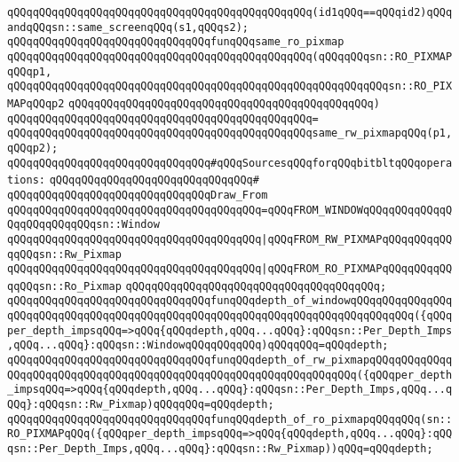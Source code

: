 \verb|qQQqqQQqqQQqqQQqqQQqqQQqqQQqqQQqqQQqqQQqqQQqqQQq(id1qQQq==qQQqid2)qQQqandqQQqsn::same_screenqQQq(s1,qQQqs2);|\newline
\newline
\verb|qQQqqQQqqQQqqQQqqQQqqQQqqQQqqQQqfunqQQqsame_ro_pixmap|\newline
\verb|qQQqqQQqqQQqqQQqqQQqqQQqqQQqqQQqqQQqqQQqqQQqqQQq(qQQqqQQqsn::RO_PIXMAPqQQqp1,|\newline
\verb|qQQqqQQqqQQqqQQqqQQqqQQqqQQqqQQqqQQqqQQqqQQqqQQqqQQqqQQqqQQqsn::RO_PIXMAPqQQqp2|\newline
\verb|qQQqqQQqqQQqqQQqqQQqqQQqqQQqqQQqqQQqqQQqqQQqqQQq)|\newline
\verb|qQQqqQQqqQQqqQQqqQQqqQQqqQQqqQQqqQQqqQQqqQQqqQQq=|\newline
\verb|qQQqqQQqqQQqqQQqqQQqqQQqqQQqqQQqqQQqqQQqqQQqqQQqsame_rw_pixmapqQQq(p1,qQQqp2);|\newline
\newline
\verb|qQQqqQQqqQQqqQQqqQQqqQQqqQQqqQQq#qQQqSourcesqQQqforqQQqbitbltqQQqoperations:|\newline
\verb|qQQqqQQqqQQqqQQqqQQqqQQqqQQqqQQq#|\newline
\verb|qQQqqQQqqQQqqQQqqQQqqQQqqQQqqQQqDraw_From|\newline
\verb|qQQqqQQqqQQqqQQqqQQqqQQqqQQqqQQqqQQqqQQq=qQQqFROM_WINDOWqQQqqQQqqQQqqQQqqQQqqQQqqQQqsn::Window|\newline
\verb|qQQqqQQqqQQqqQQqqQQqqQQqqQQqqQQqqQQqqQQq|\verb#|qQQqFROM_RW_PIXMAPqQQqqQQqqQQqqQQqsn::Rw_Pixmap#\newline
\verb|qQQqqQQqqQQqqQQqqQQqqQQqqQQqqQQqqQQqqQQq|\verb#|qQQqFROM_RO_PIXMAPqQQqqQQqqQQqqQQqsn::Ro_Pixmap#\newline
\verb|qQQqqQQqqQQqqQQqqQQqqQQqqQQqqQQqqQQqqQQq;|\newline
\newline
\verb|qQQqqQQqqQQqqQQqqQQqqQQqqQQqqQQqfunqQQqdepth_of_windowqQQqqQQqqQQqqQQqqQQqqQQqqQQqqQQqqQQqqQQqqQQqqQQqqQQqqQQqqQQqqQQqqQQqqQQqqQQqqQQq({qQQqper_depth_impsqQQq=>qQQq{qQQqdepth,qQQq...qQQq}:qQQqsn::Per_Depth_Imps,qQQq...qQQq}:qQQqsn::WindowqQQqqQQqqQQq)qQQqqQQq=qQQqdepth;|\newline
\verb|qQQqqQQqqQQqqQQqqQQqqQQqqQQqqQQqfunqQQqdepth_of_rw_pixmapqQQqqQQqqQQqqQQqqQQqqQQqqQQqqQQqqQQqqQQqqQQqqQQqqQQqqQQqqQQqqQQqqQQq({qQQqper_depth_impsqQQq=>qQQq{qQQqdepth,qQQq...qQQq}:qQQqsn::Per_Depth_Imps,qQQq...qQQq}:qQQqsn::Rw_Pixmap)qQQqqQQq=qQQqdepth;|\newline
\verb|qQQqqQQqqQQqqQQqqQQqqQQqqQQqqQQqfunqQQqdepth_of_ro_pixmapqQQqqQQq(sn::RO_PIXMAPqQQq({qQQqper_depth_impsqQQq=>qQQq{qQQqdepth,qQQq...qQQq}:qQQqsn::Per_Depth_Imps,qQQq...qQQq}:qQQqsn::Rw_Pixmap))qQQq=qQQqdepth;|\newline
